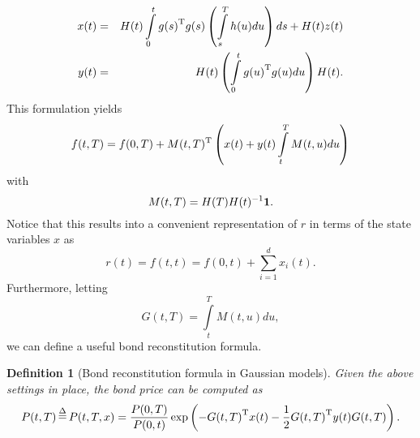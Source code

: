 \documentclass[11pt,a4paper]{article}
\theoremstyle{break} %
\newtheorem{definition}{Definition}[section]
\numberwithin{equation}{section}
\begin{document}
\begin{eqnarray}
x(t) &=& H(t)\int\limits_0^t {g{{(s)}^{\rm{T}}}g(s)\left( {\int\limits_s^T {h(u)du} } \right)ds}  + H(t)z(t)\nonumber \\
y(t) &=& H(t)\left( {\int\limits_0^t {g{{(u)}^{\rm{T}}}g(u)du} } \right)H(t).\label{eq:y_gaussian2f}
\end{eqnarray}
This formulation yields
\begin{equation*}
f(t,T) = f(0,T) + M{(t,T)^{\rm{T}}}\left( {x(t) + y(t)\int\limits_t^T {M(t,u)du} } \right)
\end{equation*}
with
\begin{equation*}
M(t,T) = H(T)H{(t)^{ - 1}}{\bf{1}}.
\end{equation*}
Notice that this results into a convenient representation of $r$ in terms of the state variables $x$ as
\begin{equation*}
  r(t) = f(t,t) = f(0,t) + \sum\limits_{i = 1}^d {{x_i}(t)}.
\end{equation*}
Furthermore, letting 
\begin{equation*}
  G(t,T) = \int\limits_t^T {M(t,u)du} ,
\end{equation*}
we can define a useful bond reconstitution formula. 
\begin{definition}[Bond reconstitution formula in Gaussian models]
Given the above settings in place, the bond price can be computed as
\begin{equation*}
  P(t,T)\mathop  = \limits^\Delta  P(t,T,x) = \frac{{P(0,T)}}{{P(0,t)}}\exp \left( { - G{{(t,T)}^{\rm{T}}}x(t) - \frac{1}{2}G{{(t,T)}^{\rm{T}}}y(t)G(t,T)} \right).
\end{equation*}
\end{definition}
\end{document}
